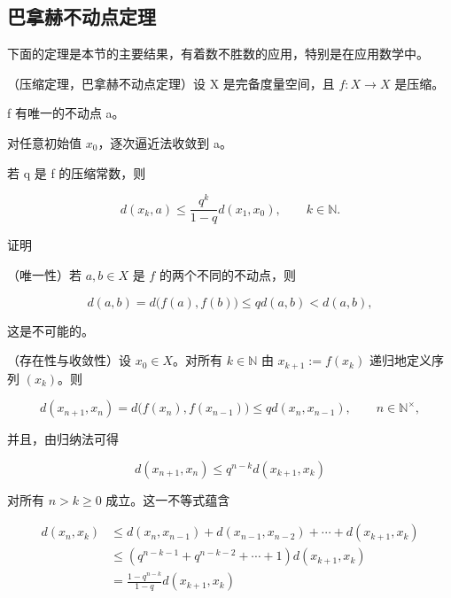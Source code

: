 \subsection*{巴拿赫不动点定理}

下面的定理是本节的主要结果，有着数不胜数的应用，特别是在应用数学中。

\begin{theorem}

（压缩定理，巴拿赫不动点定理）设 X 是完备度量空间，且 $ f: X \to X $ 是压缩。

\begin{subitems}
\item

f 有唯一的不动点 a。

\item

对任意初始值 $ x_{0} $，逐次逼近法收敛到 a。

\item

若 q 是 f 的压缩常数，则

\[
d(x_{k},a)\leq\frac{q^{k}}{1-q}d(x_{1},x_{0}),\qquad k\in\mathbb{N}.
\]
\end{subitems}

证明

\begin{items}
\item

（唯一性）若 $a, b \in X$ 是 $f$ 的两个不同的不动点，则

\[
d(a,b)=d\big(f(a),f(b)\big)\leq q d(a,b)<d(a,b),
\]

这是不可能的。

\item

（存在性与收敛性）设 $ x_0 \in X $。对所有 $ k \in \mathbb{N} $ 由 $ x_{k+1} := f(x_k) $ 递归地定义序列 $ (x_k) $。则

\[
d(x_{n+1},x_{n})=d\bigl(f(x_{n}),f(x_{n-1})\bigr)\leq q d(x_{n},x_{n-1}),\qquad n\in\mathbb{N}^{\times},
\]

并且，由归纳法可得

\begin{equation}
d(x_{n+1},x_{n})\leq q^{n-k}d(x_{k+1},x_{k})
\end{equation}

对所有 $ n > k \geq 0 $ 成立。这一不等式蕴含

\begin{equation}
\begin{aligned}
d(x_{n},x_{k})&\leq d(x_{n},x_{n-1})+d(x_{n-1},x_{n-2})+\cdots+d(x_{k+1},x_{k})\\&\leq(q^{n-k-1}+q^{n-k-2}+\cdots+1)d(x_{k+1},x_{k})\\&=\frac{1-q^{n-k}}{1-q}d(x_{k+1},x_{k})
\end{aligned}
\end{equation}


\end{items}
\end{theorem}
